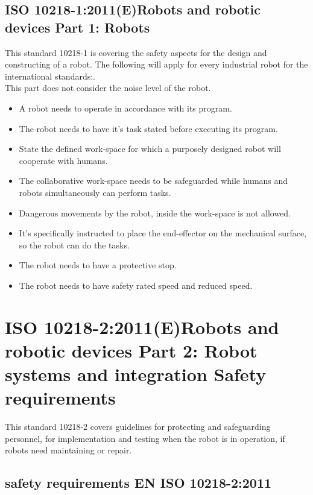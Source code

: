 \subsection{ISO 10218-1:2011(E)Robots and robotic devices Part 1: Robots}
This standard 10218-1 is covering the safety aspects for the design and constructing of a robot.
The following will apply for every industrial robot for the international standards:\cite{Robotterdel1ds}.\\
This part does not consider the noise level of the robot.
\begin{itemize}
    \item A robot needs to operate in accordance with its program.
    \item The robot needs to have it's task stated before executing its program.
    \item State the defined work-space for which a purposely designed robot will cooperate with humans.
    \item The collaborative work-space needs to be safeguarded while humans and robots simultaneously can perform tasks.
    \item Dangerous movements by the robot, inside the work-space is not allowed.
    \item It's specifically instructed to place the end-effector on the mechanical surface, so the robot can do the tasks.
    \item The robot needs to have a protective stop.
    \item The robot needs to have safety rated speed and reduced speed.
\end{itemize}
\newpage
\section{ISO 10218-2:2011(E)Robots and robotic devices Part 2: Robot systems and integration Safety requirements}\label{ISO2}
This standard 10218-2 covers guidelines for protecting and safeguarding personnel, for implementation and testing when the robot is in operation, if robots need maintaining or repair.

\subsection{safety requirements EN ISO 10218-2:2011}

